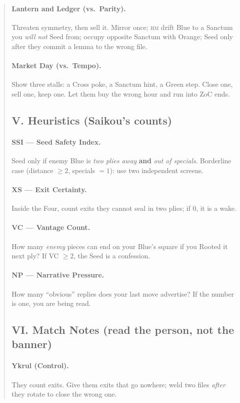 \documentclass[11pt]{article}
\begin{document}
\begin{quote}
\paragraph{Lantern and Ledger (vs.\ Parity).}
Threaten symmetry, then sell it. Mirror once; \textsc{hm} drift Blue to a Sanctum you \emph{will not} Seed from; occupy opposite Sanctum with Orange; Seed only after they commit a lemma to the wrong file.

\paragraph{Market Day (vs.\ Tempo).}
Show three stalls: a Cross poke, a Sanctum hint, a Green step. Close one, sell one, keep one. Let them buy the wrong hour and run into ZoC ends.

\subsection{V. Heuristics (Saikou’s counts)}
\paragraph{SSI — Seed Safety Index.} Seed only if enemy Blue is \emph{two plies away} \textbf{and} \emph{out of specials}. Borderline case (distance $\ge 2$, specials $=1$): use two independent screens.
\paragraph{XS — Exit Certainty.} Inside the Four, count exits they cannot seal in two plies; if $0$, it is a wake.
\paragraph{VC — Vantage Count.} How many \emph{enemy} pieces can end on your Blue’s square if you Rooted it next ply? If VC $\ge 2$, the Seed is a confession.
\paragraph{NP — Narrative Pressure.} How many “obvious” replies does your last move advertise? If the number is one, you are being read.

\subsection{VI. Match Notes (read the person, not the banner)}
\paragraph{Ykrul (Control).} They count exits. Give them exits that go nowhere; weld two files \emph{after} they rotate to close the wrong one.

\end{quote}
\end{document}
